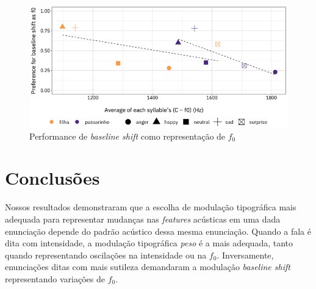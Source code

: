 \documentclass[11pt]{article}
\begin{document}
\begin{figure}[H]
     {\centering
\includegraphics[width=\linewidth]{fig/baseline_shift_as_pitch.png}
     \caption{Performance de {\itshape baseline shift} como representação de $f_0$}
     \label{fig:baseline_shift_as_f0}\par}
\end{figure}

\section{Conclus\~{o}es}
  \label{sec:conclusoes}
  
  Nossos resultados demonstraram que a escolha de modulação tipográfica mais adequada para representar mudanças nas {\itshape features} acústicas em uma dada enunciação depende do padrão acústico dessa mesma enunciação. Quando a fala é dita com intensidade, a modulação tipográfica {\itshape peso} é a mais adequada, tanto quando representando oscilações na intensidade ou na $f_0$. Inversamente, enunciações ditas com mais sutileza demandaram a modulação {\itshape baseline shift} representando variações de $f_0$.

  

   
\end{document}
